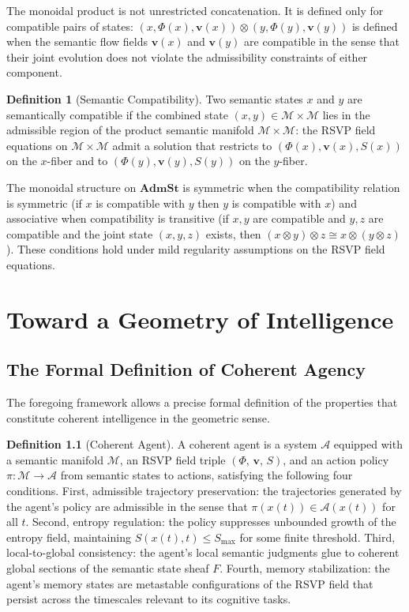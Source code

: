 \documentclass[12pt, a4paper, openany]{book}
\theoremstyle{plain}
\theoremstyle{definition}
\newtheorem{definition}[theorem]{Definition}
\theoremstyle{remark}
\newcommand{\vvec}{\mathbf{v}}
\newcommand{\Sfield}{S}
\newcommand{\Adm}{\mathcal{A}}
\newcommand{\RSVPtriple}{(\Phi,\,\vvec,\,\Sfield)}
\begin{document}
The monoidal product is not unrestricted concatenation. It is defined only for compatible pairs of states: $(x, \Phi(x), \vvec(x)) \otimes (y, \Phi(y), \vvec(y))$ is defined when the semantic flow fields $\vvec(x)$ and $\vvec(y)$ are compatible in the sense that their joint evolution does not violate the admissibility constraints of either component.

\begin{definition}[Semantic Compatibility]
Two semantic states $x$ and $y$ are semantically compatible if the combined state $(x, y) \in \mathcal{M} \times \mathcal{M}$ lies in the admissible region of the product semantic manifold $\mathcal{M} \times \mathcal{M}$: the RSVP field equations on $\mathcal{M} \times \mathcal{M}$ admit a solution that restricts to $(\Phi(x), \vvec(x), \Sfield(x))$ on the $x$-fiber and to $(\Phi(y), \vvec(y), \Sfield(y))$ on the $y$-fiber.
\end{definition}

The monoidal structure on $\mathbf{AdmSt}$ is symmetric when the compatibility relation is symmetric (if $x$ is compatible with $y$ then $y$ is compatible with $x$) and associative when compatibility is transitive (if $x, y$ are compatible and $y, z$ are compatible and the joint state $(x,y,z)$ exists, then $(x \otimes y) \otimes z \cong x \otimes (y \otimes z)$). These conditions hold under mild regularity assumptions on the RSVP field equations.

\chapter{Toward a Geometry of Intelligence}

\section{The Formal Definition of Coherent Agency}

The foregoing framework allows a precise formal definition of the properties that constitute coherent intelligence in the geometric sense.

\begin{definition}[Coherent Agent]
A coherent agent is a system $\mathcal{A}$ equipped with a semantic manifold $\mathcal{M}$, an RSVP field triple $\RSVPtriple$, and an action policy $\pi: \mathcal{M} \to \mathcal{A}$ from semantic states to actions, satisfying the following four conditions. First, admissible trajectory preservation: the trajectories generated by the agent's policy are admissible in the sense that $\pi(x(t)) \in \Adm(x(t))$ for all $t$. Second, entropy regulation: the policy suppresses unbounded growth of the entropy field, maintaining $\Sfield(x(t), t) \leq \Sfield_{\max}$ for some finite threshold. Third, local-to-global consistency: the agent's local semantic judgments glue to coherent global sections of the semantic state sheaf $F$. Fourth, memory stabilization: the agent's memory states are metastable configurations of the RSVP field that persist across the timescales relevant to its cognitive tasks.
\end{definition}
\end{document}
